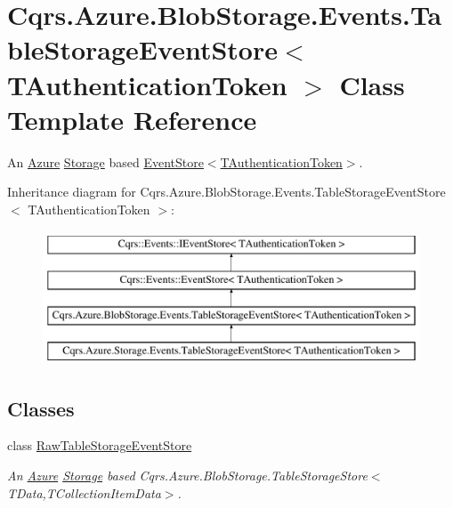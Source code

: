 \hypertarget{classCqrs_1_1Azure_1_1BlobStorage_1_1Events_1_1TableStorageEventStore}{}\section{Cqrs.\+Azure.\+Blob\+Storage.\+Events.\+Table\+Storage\+Event\+Store$<$ T\+Authentication\+Token $>$ Class Template Reference}
\label{classCqrs_1_1Azure_1_1BlobStorage_1_1Events_1_1TableStorageEventStore}


An \hyperlink{namespaceCqrs_1_1Azure}{Azure} \hyperlink{namespaceCqrs_1_1Azure_1_1Storage}{Storage} based \hyperlink{classCqrs_1_1Events_1_1EventStore_a6346cb2aea4c5b4e740dc6cfb15abab8_a6346cb2aea4c5b4e740dc6cfb15abab8}{Event\+Store$<$\+T\+Authentication\+Token$>$}.  


Inheritance diagram for Cqrs.\+Azure.\+Blob\+Storage.\+Events.\+Table\+Storage\+Event\+Store$<$ T\+Authentication\+Token $>$\+:\begin{figure}[H]
\begin{center}
\leavevmode
\includegraphics[height=4.000000cm]{classCqrs_1_1Azure_1_1BlobStorage_1_1Events_1_1TableStorageEventStore}
\end{center}
\end{figure}
\subsection*{Classes}
\begin{DoxyCompactItemize}
\item 
class \hyperlink{classCqrs_1_1Azure_1_1BlobStorage_1_1Events_1_1TableStorageEventStore_1_1RawTableStorageEventStore}{Raw\+Table\+Storage\+Event\+Store}
\begin{DoxyCompactList}\small\item\em An \hyperlink{namespaceCqrs_1_1Azure}{Azure} \hyperlink{namespaceCqrs_1_1Azure_1_1Storage}{Storage} based Cqrs.\+Azure.\+Blob\+Storage.\+Table\+Storage\+Store$<$\+T\+Data,\+T\+Collection\+Item\+Data$>$. \end{DoxyCompactList}\end{DoxyCompactItemize}
